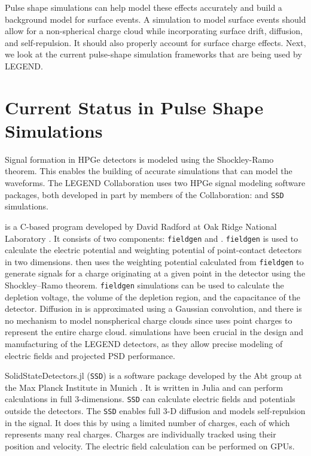 Pulse shape simulations can help model these effects accurately and build a background model for surface events. A simulation to model surface events should allow for a non-spherical charge cloud while incorporating surface drift, diffusion, and self-repulsion. It should also properly account for surface charge effects. Next, we look at the current pulse-shape simulation frameworks that are being used by LEGEND.

\section{Current Status in Pulse Shape Simulations}
Signal formation in HPGe detectors is modeled using the Shockley-Ramo theorem. This enables the building of accurate simulations that can model the waveforms. The LEGEND Collaboration uses two HPGe signal modeling software packages, both developed in part by members of the Collaboration: {\siggen} and \texttt{SSD} simulations. 

{\siggen} is a C-based program developed by David Radford at Oak Ridge National Laboratory \cite{siggen_paper}. It consists of two components: \texttt{fieldgen} and {\siggen}. \texttt{fieldgen} is used to calculate the electric potential and weighting potential of point-contact detectors in two dimensions. {\siggen} then uses the weighting potential calculated from \texttt{fieldgen} to generate signals for a charge originating at a given point in the detector using the Shockley–Ramo theorem. \texttt{fieldgen} simulations can be used to calculate the depletion voltage, the volume of the depletion region, and the capacitance of the detector. Diffusion in {\siggen} is approximated using a Gaussian convolution, and there is no mechanism to model nonspherical charge clouds since {\siggen} uses point charges to represent the entire charge cloud. {\siggen} simulations have been crucial in the design and manufacturing of the LEGEND detectors, as they allow precise modeling of electric fields and projected PSD performance.


SolidStateDetectors.jl (\texttt{SSD}) is a software package developed by the Abt group at the Max Planck Institute in Munich \cite{Abt:2021SSD}. It is written in Julia and can perform calculations in full 3-dimensions. \texttt{SSD} can calculate electric fields and potentials outside the detectors. The \texttt{SSD} enables full 3-D diffusion and models self-repulsion in the signal. It does this by using a limited number of charges, each of which represents many real charges. Charges are individually tracked using their position and velocity. The electric field calculation can be performed on GPUs. 


